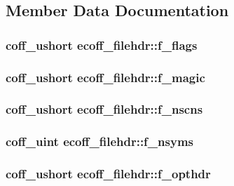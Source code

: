 \subsection{Member Data Documentation}
\hypertarget{structecoff__filehdr_ac623a83f904bd61f81517b5c537178b6}{
\subsubsection[{f\_\-flags}]{\setlength{\rightskip}{0pt plus 5cm}coff\_\-ushort {\bf ecoff\_\-filehdr::f\_\-flags}}}
\label{structecoff__filehdr_ac623a83f904bd61f81517b5c537178b6}
\hypertarget{structecoff__filehdr_ab522e125186b6df344a2bf33f8bb3428}{
\subsubsection[{f\_\-magic}]{\setlength{\rightskip}{0pt plus 5cm}coff\_\-ushort {\bf ecoff\_\-filehdr::f\_\-magic}}}
\label{structecoff__filehdr_ab522e125186b6df344a2bf33f8bb3428}
\hypertarget{structecoff__filehdr_aa9daf6d29a4caffd5483122cca083c47}{
\subsubsection[{f\_\-nscns}]{\setlength{\rightskip}{0pt plus 5cm}coff\_\-ushort {\bf ecoff\_\-filehdr::f\_\-nscns}}}
\label{structecoff__filehdr_aa9daf6d29a4caffd5483122cca083c47}
\hypertarget{structecoff__filehdr_aa43f6c44137652939214788a0060b479}{
\subsubsection[{f\_\-nsyms}]{\setlength{\rightskip}{0pt plus 5cm}coff\_\-uint {\bf ecoff\_\-filehdr::f\_\-nsyms}}}
\label{structecoff__filehdr_aa43f6c44137652939214788a0060b479}
\hypertarget{structecoff__filehdr_a3caac3fb501a963bfba324a21709ab65}{
\subsubsection[{f\_\-opthdr}]{\setlength{\rightskip}{0pt plus 5cm}coff\_\-ushort {\bf ecoff\_\-filehdr::f\_\-opthdr}}}
